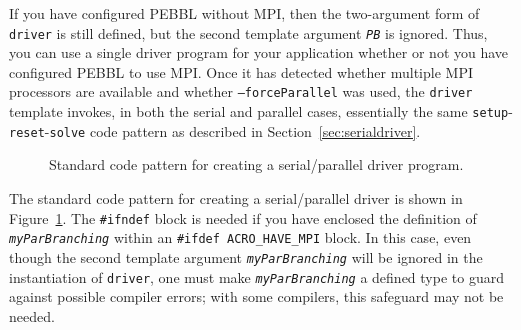 If you have configured PEBBL without MPI, then the two-argument form
of \texttt{driver} is still defined, but the second template argument
\texttt{\emph{PB}} is ignored.  Thus, you can use a single driver program
for your application whether or not you have configured PEBBL to use
MPI.  Once it has detected whether multiple MPI processors are available
and whether \texttt{--forceParallel} was used, the \texttt{driver}
template invokes, in both the serial and parallel cases, essentially
the same \texttt{setup}-\texttt{reset}-\texttt{solve} code pattern as
described in Section~\ref{sec:serialdriver}.

\begin{figure}[tbp]
\begin{center}
\end{center}
\vspace{-2ex}
\caption{Standard code pattern for creating a serial/parallel driver program.}
\label{fig:pardriver}
\end{figure}

The standard code pattern for creating a serial/parallel driver is
shown in Figure~\ref{fig:pardriver}.  The \texttt{\#ifndef} block is
needed if you have enclosed the definition of
\texttt{\emph{myParBranching}} within an \texttt{\#ifdef
  ACRO\_HAVE\_MPI} block.  In this case, even though the second
template argument \texttt{\emph{myParBranching}} will be ignored in
the instantiation of \texttt{driver}, one must make
\texttt{\emph{myParBranching}} a defined type to guard against
possible compiler errors; with some compilers, this safeguard may not
be needed.

